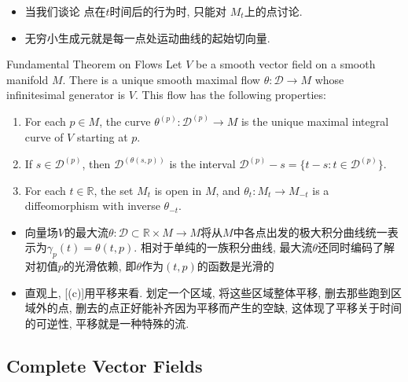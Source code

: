 \documentclass[../main.tex]{subfiles}
\begin{document}
\begin{note}
    \begin{itemize}
        \item 当我们谈论 点在\(  t  \)时间后的行为时, 只能对 \(  M_{t}  \)上的点讨论.   
        \item 无穷小生成元就是每一点处运动曲线的起始切向量.
    \end{itemize}
    
\end{note}


\begin{theorem}{Fundamental Theorem on Flows}{}
Let $V$ be a smooth vector field on a smooth manifold $M$. There is a unique smooth maximal flow $\theta: \mathcal{D} \to M$ whose infinitesimal generator is $V$. This flow has the following properties:
\begin{enumerate}
    \item[(a)] For each $p \in M$, the curve $\theta^{(p)}: \mathcal{D}^{(p)} \to M$ is the unique maximal integral curve of $V$ starting at $p$.
    \item[(b)] If $s \in \mathcal{D}^{(p)}$, then $\mathcal{D}^{(\theta(s,p))}$ is the interval $\mathcal{D}^{(p)} - s = \{t - s : t \in \mathcal{D}^{(p)}\}$.
    \item[(c)] For each $t \in \mathbb{R}$, the set $M_t$ is open in $M$, and $\theta_t: M_t \to M_{-t}$ is a diffeomorphism with inverse $\theta_{-t}$.
\end{enumerate}
\end{theorem}
\begin{note}
    \begin{itemize}
        \item 向量场$V$的最大流$\theta : \mathcal D \subset \mathbb R \times M \to M$将从$M$中各点出发的极大积分曲线统一表示为$\gamma_p(t) = \theta(t,p)$. 相对于单纯的一族积分曲线, 最大流$\theta$还同时编码了解对初值$p$的光滑依赖, 即$\theta$作为$(t,p)$的函数是光滑的
        \item 直观上, [(c)]用平移来看. 划定一个区域, 将这些区域整体平移, 删去那些跑到区域外的点, 删去的点正好能补齐因为平移而产生的空缺, 这体现了平移关于时间的可逆性, 平移就是一种特殊的流.
    \end{itemize}
    
\end{note}

\subsection{Complete Vector Fields}
\end{document}
